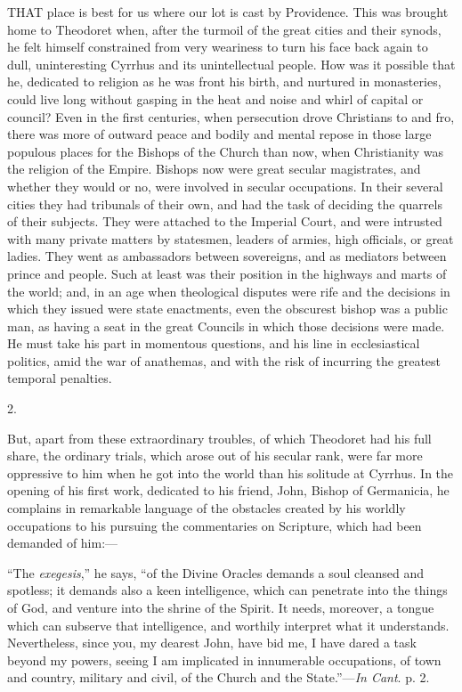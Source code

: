 THAT place is best for us where our lot
is cast by Providence. This was brought home to Theodoret when, after
the turmoil of the great cities and their synods, he felt himself
constrained from very weariness to turn his face back again to dull,
uninteresting Cyrrhus and its unintellectual people. How was it
possible that he, dedicated to religion as he was front his birth, and
nurtured in monasteries, could live long without gasping in the heat
and noise and whirl of capital or council? Even in the first
centuries, when persecution drove Christians to and fro, there was
more of outward peace and bodily and mental repose in those large
populous places for the Bishops of the Church than now, when
Christianity was the religion of the Empire. Bishops now were great
secular magistrates, and whether they would or no, were involved in
secular occupations. In their several cities they had tribunals of
their own, and had the task of deciding the quarrels of their
subjects. They were attached to the Imperial Court, and were intrusted
with many private matters by statesmen, leaders of armies, high
officials, or great ladies. They went as ambassadors between
sovereigns, and as mediators between prince and people. Such at least
was their position in the highways and marts of the world; and, in an
age when theological disputes were rife and the decisions in which
they issued were state enactments, even the obscurest bishop was a
public man, as having a seat in the great Councils in which
those decisions were made. He must take his part in momentous
questions, and his line in ecclesiastical politics, amid the war of
anathemas, and with the risk of incurring the greatest temporal
penalties.

2.

But, apart from these extraordinary troubles, of which Theodoret
had his full share, the ordinary trials, which arose out of his
secular rank, were far more oppressive to him when he got into the
world than his solitude at Cyrrhus. In the opening of his first work,
dedicated to his friend, John, Bishop of Germanicia, he complains in
remarkable language of the obstacles created by his worldly
occupations to his pursuing the commentaries on Scripture, which had
been demanded of him:—

``The \emph{exegesis},'' he says, ``of the Divine
Oracles demands a soul cleansed and spotless; it demands also a keen
intelligence, which can penetrate into the things of God, and venture
into the shrine of the Spirit. It needs, moreover, a tongue which can
subserve that intelligence, and worthily interpret what it
understands. Nevertheless, since you, my dearest John, have bid me, I
have dared a task beyond my powers, seeing I am implicated in
innumerable occupations, of town and country, military and civil, of
the Church and the State.''—\emph{In Cant}. p. 2.


